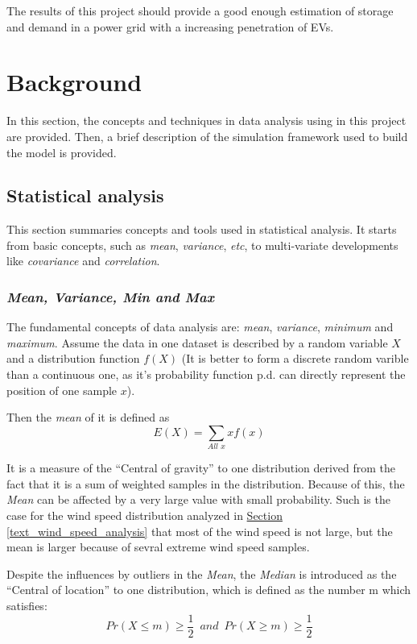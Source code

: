 \documentclass[12pt,a4paper]{report}
\begin{document}
        The results of this project should provide a good enough estimation of storage and demand in a power grid with a increasing penetration of EVs.
    \chapter{Background}
        In this section, the concepts and techniques in data analysis using in this project are provided. Then, a brief description of the simulation framework used to build the model is provided.

        \section{Statistical analysis}
        This section summaries concepts and tools used in statistical analysis. It starts from basic concepts, such as \emph{mean}, \emph{variance}, \emph{etc}, to multi-variate developments like \emph{covariance} and \emph{correlation}.
        \subsection{\emph{Mean, Variance, Min and Max}}
        The fundamental concepts of data analysis are: \emph{mean}, \emph{variance}, \emph{minimum} and \emph{maximum}. Assume the data in one dataset is described by a random variable $X$ and a distribution function $f(X)$ (It is better to form a discrete random varible than a continuous one, as it's probability function p.d. can directly represent the position of one sample $x$). 
        
        Then the \emph{mean} of it is defined as 
        \begin{equation}
            E(X) = \sum_{All\,\, x} x f(x)
            \label{formula_mean}
        \end{equation}

        It is a measure of the ``Central of gravity'' to one distribution derived from the fact that it is a sum of weighted samples in the distribution. Because of this, the \emph{Mean} can be affected by a very large value with small probability. Such is the case for the wind speed distribution analyzed in \hyperref[text_wind_speed_analysis]{Section \ref*{text_wind_speed_analysis}} that most of the wind speed is not large, but the mean is larger because of sevral extreme wind speed samples.

        Despite the influences by outliers in the \emph{Mean}, the \emph{Median} is introduced as the ``Central of location'' to one distribution, which is defined as the number m which satisfies:
        \begin{equation}
            Pr(X\leq m) \geq \frac{1}{2} \,\,\, and \,\,\, Pr(X\geq m) \geq \frac{1}{2}
        \end{equation}
        
\end{document}
